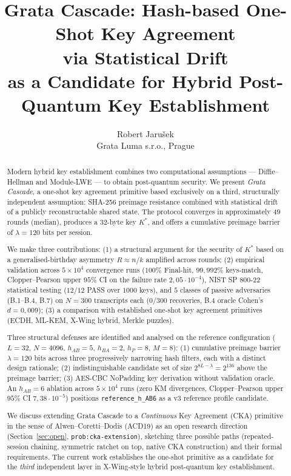 \documentclass[11pt,a4paper]{article}
\title{Grata Cascade: Hash-based One-Shot Key Agreement\\
via Statistical Drift\\
\large as a Candidate for Hybrid Post-Quantum Key Establishment}
\author{Robert Jarušek\\Grata Luma s.r.o., Prague}
\date{}
\begin{document}
\maketitle

\begin{abstract}
Modern hybrid key establishment combines two computational assumptions --- Diffie--Hellman and Module-LWE --- to obtain post-quantum security. We present \emph{Grata Cascade}, a one-shot key agreement primitive based exclusively on a third, structurally independent assumption: SHA-256 preimage resistance combined with statistical drift of a publicly reconstructable shared state. The protocol converges in approximately $49$ rounds (median), produces a 32-byte key $K^*$, and offers a cumulative preimage barrier of $\lambda = 120$ bits per session.

We make three contributions: (1) a structural argument for the security of $K^*$ based on a generalised-birthday asymmetry $R \approx n/k$ amplified across rounds; (2) empirical validation across $5 \times 10^4$ convergence runs ($100\%$ Final-hit, $99{,}992\%$ keys-match, Clopper--Pearson upper $95\%$ CI on the failure rate $2{,}05 \cdot 10^{-4}$), NIST SP 800-22 statistical testing ($12/12$ PASS over $1000$ keys), and $5$ classes of passive adversaries (B.1--B.4, B.7) on $N=300$ transcripts each ($0/300$ recoveries, B.4 oracle Cohen's $d = 0{,}009$); (3) a comparison with established one-shot key agreement primitives (ECDH, ML-KEM, X-Wing hybrid, Merkle puzzles).

Three structural defenses are identified and analysed on the reference configuration ($L = 32$, $N = 4096$, $h_{AB} = 5$, $h_{BA} = 2$, $h_P = 8$, $M = 8$): (1) cumulative preimage barrier $\lambda = 120$ bits across three progressively narrowing hash filters, each with a distinct design rationale; (2) indistinguishable candidate set of size $2^{8L - \lambda} = 2^{136}$ above the preimage barrier; (3) AES-CBC NoPadding key derivation without validation oracle. An $h_{AB} = 6$ ablation across $5 \times 10^4$ runs (zero KM divergences, Clopper--Pearson upper $95\%$ CI $7{,}38 \cdot 10^{-5}$) positions \texttt{reference\_h\_AB6} as a v3 reference profile candidate.

We discuss extending Grata Cascade to a \emph{Continuous} Key Agreement (CKA) primitive in the sense of Alwen--Coretti--Dodis (ACD19) as an open research direction (Section~\ref{sec:open}, \texttt{prob:cka-extension}), sketching three possible paths (repeated-session chaining, symmetric ratchet on top, native CKA construction) and their formal requirements. The current work establishes the one-shot primitive as a candidate for the \emph{third} independent layer in X-Wing-style hybrid post-quantum key establishment.
\end{abstract}
\end{document}
